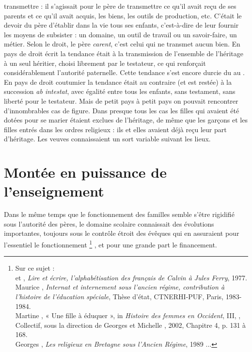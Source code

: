 \begin{enumerate}
transmettre : il s'agissait pour le père de transmettre ce qu'il avait reçu de ses parents et ce qu'il avait acquis, les biens, les outils de production, etc. C'était le devoir du père d'établir dans la vie tous ses enfants, c'est-à-dire de leur fournir les moyens de subsister : un domaine, un outil de travail ou un savoir-faire, un métier. Selon le droit, le père \emph{carent}, c'est celui qui ne transmet aucun bien. En pays de droit écrit la tendance était à la transmission de l'ensemble de l'héritage à un seul héritier, choisi librement par le testateur, ce qui renforçait considérablement l'autorité paternelle. Cette tendance s'est encore durcie du  au . En pays de droit coutumier la tendance était au contraire (et est restée) à la succession \emph{ab intestat}, avec égalité entre tous les enfants, sans testament, sans liberté pour le testateur. Mais de petit pays à petit pays on pouvait rencontrer d'innombrables cas de figure. Dans presque tous les cas les filles qui avaient été dotées pour se marier étaient exclues de l'héritage, de même que les garçons et les filles entrés dans les ordres religieux : ils et elles avaient déjà reçu leur part d'héritage. Les veuves connaissaient un sort variable suivant les lieux. 
\end{enumerate}

\section{Montée en puissance de l'enseignement}

 Dans le même temps que le fonctionnement des familles semble s'être rigidifié sous l'autorité des pères, le domaine scolaire connaissait des évolutions importantes, toujours sous le contrôle étroit des évêques qui en assuraient pour l'essentiel le fonctionnement%
%
\footnote{Sur ce sujet :
\\ et , \emph{Lire et écrire, l'alphabétisation des français de Calvin à Jules Ferry}, 1977.
\\Maurice {}, \emph{Internat et internement sous l'ancien régime, contribution à l'histoire de l'éducation spéciale}, Thèse d'état, CTNERHI-PUF, Paris, 1983-1984.
\\Martine {}, {« Une fille à éduquer », in \emph{Histoire des femmes en Occident}, III, }, Collectif, sous la direction de Georges  et Michelle , 2002, Chapitre 4, p. 131 à 168.
\\Georges {}, \emph{Les religieux en Bretagne sous l'Ancien Régime}, 1989 ...}%
, et pour une grande part le financement.


